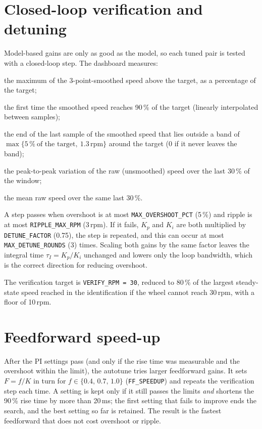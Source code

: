 \documentclass[11pt,a4paper]{report}
\newcommand{\code}[1]{\texttt{#1}}
\newcommand{\rpm}{\,\mathrm{rpm}}
\begin{document}
\section{Closed-loop verification and detuning}
Model-based gains are only as good as the model, so each tuned pair is tested with a closed-loop step. The dashboard measures:
\begin{description}[noitemsep]
  \item[Overshoot] the maximum of the 3-point-smoothed speed above the target, as a percentage of the target;
  \item[Rise time (90\,\%)] the first time the smoothed speed reaches 90\,\% of the target (linearly interpolated between samples);
  \item[Settling time] the end of the last sample of the smoothed speed that lies outside a band of $\max\{5\,\%\ \text{of the target},\ 1.3\rpm\}$ around the target (0 if it never leaves the band);
  \item[Ripple] the peak-to-peak variation of the raw (unsmoothed) speed over the last 30\,\% of the window;
  \item[Final value] the mean raw speed over the same last 30\,\%.
\end{description}
A step passes when overshoot is at most \code{MAX\_OVERSHOOT\_PCT} (5\,\%) and ripple is at most \code{RIPPLE\_MAX\_RPM} (3\,rpm). If it fails, $K_p$ and $K_i$ are both multiplied by \code{DETUNE\_FACTOR} (0.75), the step is repeated, and this can occur at most \code{MAX\_DETUNE\_ROUNDS} (3) times. Scaling both gains by the same factor leaves the integral time $\tau_I=K_p/K_i$ unchanged and lowers only the loop bandwidth, which is the correct direction for reducing overshoot.

The verification target is \code{VERIFY\_RPM = 30}, reduced to 80\,\% of the largest steady-state speed reached in the identification if the wheel cannot reach 30\,rpm, with a floor of 10\,rpm.

\section{Feedforward speed-up}\label{sec:verify-phase}
After the PI settings pass (and only if the rise time was measurable and the overshoot within the limit), the autotune tries larger feedforward gains. It sets $F = f/K$ in turn for $f \in \{0.4,\,0.7,\,1.0\}$ (\code{FF\_SPEEDUP}) and repeats the verification step each time. A setting is kept only if it still passes the limits \emph{and} shortens the 90\,\% rise time by more than 20\,ms; the first setting that fails to improve ends the search, and the best setting so far is retained. The result is the fastest feedforward that does not cost overshoot or ripple.
\end{document}
